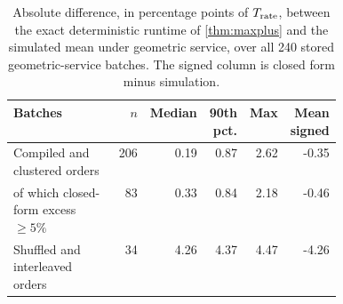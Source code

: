 \begin{table}[htbp]
\centering\small
\begin{tabular}{p{0.43\linewidth}rrrrr}
\toprule
Batches & $n$ & Median & 90th pct. & Max & Mean signed\\\midrule
Compiled and clustered orders & 206 & 0.19 & 0.87 & 2.62 & -0.35\\
\quad of which closed-form excess $\ge5\%$ & 83 & 0.33 & 0.84 & 2.18 & -0.46\\
Shuffled and interleaved orders & 34 & 4.26 & 4.37 & 4.47 & -4.26\\
\bottomrule
\end{tabular}
\caption{Absolute difference, in percentage points of $T_{\rm rate}$, between the exact deterministic runtime of \cref{thm:maxplus} and the simulated mean under geometric service, over all 240 stored geometric-service batches. The signed column is closed form minus simulation.}
\label{tab:predictor}
\end{table}
